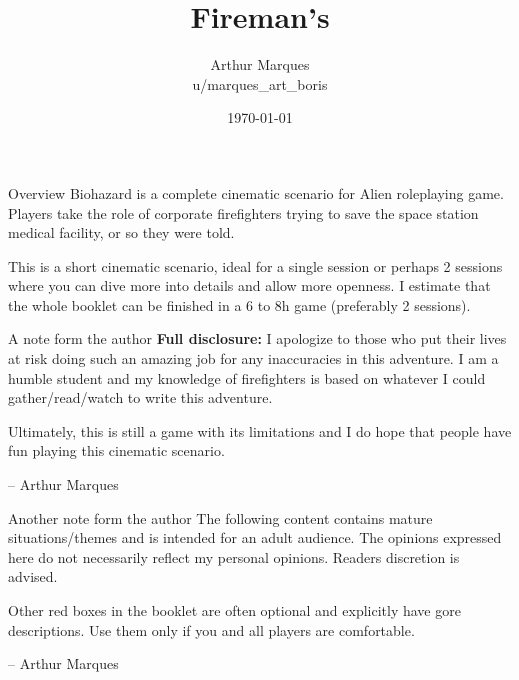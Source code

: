 \documentclass[10pt,twoside,twocolumn]{book}
\title{Fireman's}
\date{\today}
\author{Arthur Marques \\ u/marques\_art\_boris}
\begin{document}
\selectfont %
\frontmatter

\maketitle


\begin{rpg-commentbox}{Overview}
  Biohazard is a complete cinematic scenario for Alien roleplaying game. Players take the role of corporate firefighters trying to save the space station medical facility, or so they were told.

  This is a short cinematic scenario, ideal for a single session or perhaps 2 sessions where you can dive more into details and allow more openness. I estimate that the whole booklet can be finished in a 6 to 8h game (preferably 2 sessions).
\end{rpg-commentbox}



\medskip
\begin{rpg-commentbox}{A note form the author}
  \textbf{Full disclosure:} I apologize to those who put their lives at risk doing such an amazing job for any inaccuracies in this adventure. I am a humble student and my knowledge of firefighters is based on whatever I could gather/read/watch to write this adventure. 
  
  Ultimately, this is still a game with its limitations and I do hope that people have fun playing this cinematic scenario.
  \begin{flushright}
  -- Arthur Marques
  \end{flushright}
\end{rpg-commentbox}



\begin{rpg-warnbox}{Another note form the author}
  The following content contains mature situations/themes and is intended for an adult audience. The opinions expressed here do not necessarily reflect my personal opinions. Readers discretion is advised.

  Other red boxes in the booklet are often optional and explicitly have gore descriptions. Use them only if you and all players are comfortable.

  \begin{flushright}
  -- Arthur Marques
  \end{flushright}
\end{rpg-warnbox}


%


\clearpage



\tableofcontents

\mainmatter

% 

% 
% 
% 
% 

\end{document}
